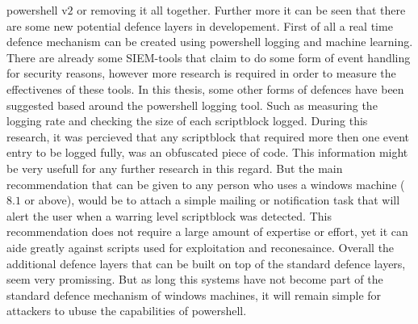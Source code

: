 \documentclass{article}%
\begin{document}
powershell v$2$ or removing it all together. Further more it can be seen that there are some new potential defence layers in developement. First of all a real time defence mechanism can be created using powershell logging and machine learning. There are already some SIEM-tools that claim to do some form of event handling for security reasons, however more research is required in order to measure the effectivenes of these tools. In this thesis, some other forms of defences have been suggested based around the powershell logging tool. Such as measuring the logging rate and checking the size of each scriptblock logged. During this research, it was percieved that any scriptblock that required more then one event entry to be logged fully, was an obfuscated piece of code. This information might be very usefull for any further research in this regard. But the main recommendation that can be given to any person who uses a windows machine ($8.1$ or above), would be to attach a simple mailing or notification task that will alert the user when a warring level scriptblock was detected. This recommendation does not require a large amount of expertise or effort, yet it can aide greatly against scripts used for exploitation and reconesaince. Overall the additional defence layers that can be built on top of the standard defence layers, seem very promissing. But as long this systems have not become part of the standard defence mechanism of windows machines, it will remain simple for attackers to ubuse the capabilities of powershell. 
\newpage
\end{document}
